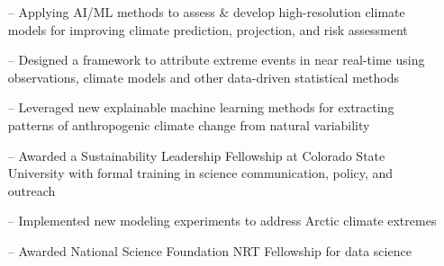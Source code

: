 \documentclass[10pt,letterpaper]{altacv} %
\begin{document}
\vspace*{-0.2cm}

\begin{itemize}
    \setlength{\itemindent}{0.5em}
    \item[--]   \small{Applying AI\slash ML methods to assess \& develop high-resolution climate models for improving climate prediction, projection, and risk assessment}
\end{itemize}
\medskip


\begin{itemize}
    \setlength{\itemindent}{0.5em}
    \item[--]   \small{Designed a framework to attribute extreme events in near real-time using observations, climate models and other data-driven statistical methods}
\end{itemize}
\medskip

\begin{itemize}
    \setlength{\itemindent}{0.5em}
    \item[--]   \small{Leveraged new explainable machine learning methods for extracting patterns of anthropogenic climate change from natural variability}
    \item[--]    \small{Awarded a Sustainability Leadership Fellowship at Colorado State University with formal training in science communication, policy, and outreach}
\end{itemize}
\medskip

\begin{itemize}
    \setlength{\itemindent}{0.5em}
    \item[--]   \small{Implemented new modeling experiments to address Arctic climate extremes}
    \item[--]    \small{Awarded National Science Foundation NRT Fellowship for data science}
\end{itemize}
\end{document}
